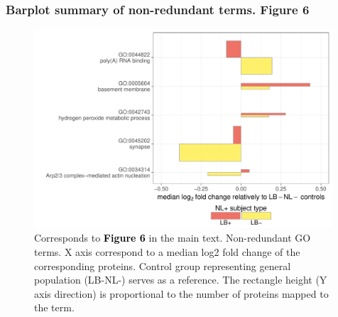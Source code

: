 \documentclass[11pt]{article}\usepackage[]{graphicx}\usepackage[usenames,dvipsnames]{color}
\newenvironment{knitrout}{}{} %
\begin{document}
\clearpage





\subsubsection{Barplot summary of non-redundant terms. Figure 6}

\begin{figure}[h!]
\center
\begin{minipage}{0.8\textwidth}
\begin{knitrout}
\color{fgcolor}

{\centering \includegraphics[width=0.99\textwidth]{figure/figure5_barplot-1} 

}



\end{knitrout}
\caption{Corresponds to
\textcolor{black}{\colorbox{highlighter}{\textbf{Figure 6}}} in the main text.
Non-redundant GO terms. X axis correspond to a median log2 fold change of the corresponding proteins. Control group representing general population (LB-NL-) serves as a reference. The rectangle height (Y axis direction) is proportional to the number of proteins mapped to the term.
}
\label{fig:GObar}
\end{minipage}
\end{figure}
\end{document}
